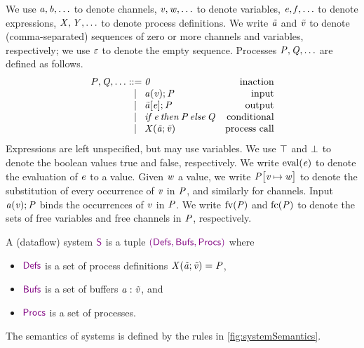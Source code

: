 \documentclass{article}
\theoremstyle{definition}
\begin{document}
We use $\fProc{a},\fProc{b},\ldots$ to denote channels, $\fProc{v},\fProc{w},\ldots$ to denote variables, $\fProc{e},\fProc{f},\ldots$ to denote expressions, $\fProc{X},\fProc{Y},\ldots$ to denote process definitions.
We write $\fProc{\tilde{a}}$ and $\fProc{\tilde{v}}$ to denote (comma-separated) sequences of zero or more channels and variables, respectively; we use $\fProc{\epsi}$ to denote the empty sequence.
Processes $\fProc{P},\fProc{Q},\ldots$ are defined as follows.
\[
    \begin{array}{@{}r@{}c@{}lr@{}}
        \fProc{P},\fProc{Q},\ldots & {}::={} &
        \fProc{0} & \text{inaction}
        \\
        & \sepr &
        \fProc{\pIn a(v) ; P} & \text{input}
        \\
        & \sepr &
        \fProc{\pOut \tilde{a}[e] ; P} & \text{output}
        \\
        & \sepr &
        \fProc{\pIf e \pThen P \pElse Q} & \text{conditional}
        \\
        & \sepr &
        \fProc{\pCall X(\tilde{a};\tilde{v})} & \text{process call}
    \end{array}
\]
Expressions are left unspecified, but may use variables.
We use $\fProc{\top}$ and $\fProc{\bot}$ to denote the boolean values true and false, respectively.
We write $\eval(\fProc{e})$ to denote the evaluation of $\fProc{e}$ to a value.
Given $\fProc{w}$ a value, we write $\fProc{P \pSubst{v \subst w}}$ to denote the substitution of every occurrence of $\fProc{v}$ in $\fProc{P}$, and similarly for channels.
Input $\fProc{\pIn a(v) ; P}$ binds the occurrences of $\fProc{v}$ in $\fProc{P}$.
We write $\fv(\fProc{P})$ and $\fc(\fProc{P})$ to denote the sets of free variables and free channels in $\fProc{P}$, respectively.

A (dataflow) system $\fSys{S}$ is a tuple $\fSys{(Defs,Bufs,Procs)}$ where
\begin{itemize}
    \item $\fSys{Defs}$ is a set of process definitions $\fProc{\pCall X(\tilde{a};\tilde{v}) = P}$,
    \item $\fSys{Bufs}$ is a set of buffers $\fProc{a:\tilde{v}}$, and
    \item $\fSys{Procs}$ is a set of processes.
\end{itemize}
The semantics of systems is defined by the rules in \cref{fig:systemSemantics}.
\end{document}
